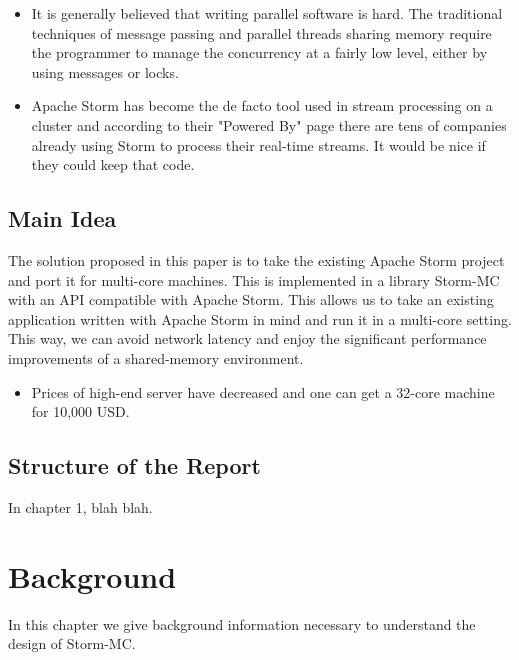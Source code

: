 \documentclass[bsc,frontabs,twoside,singlespacing,normalheadings,parskip,logo]{infthesis}     %
\begin{document}
\begin{itemize}

\item It is generally believed that writing parallel software is hard. The traditional techniques of message passing and parallel threads sharing memory require the programmer to manage the concurrency at a fairly low level, either by using messages or locks.

\item Apache Storm has become the de facto tool used in stream processing on a cluster and according to their "Powered By" page \cite{Anonymous:eikzOt4-} there are tens of companies already using Storm to process their real-time streams. It would be nice if they could keep that code.

\end{itemize}

\section{Main Idea}

The solution proposed in this paper is to take the existing Apache Storm project and port it for multi-core machines. This is implemented in a library Storm-MC with an API compatible with Apache Storm. This allows us to take an existing application written with Apache Storm in mind and run it in a multi-core setting. This way, we can avoid network latency and enjoy the significant performance improvements of a shared-memory environment.

\begin{itemize}

	\item Prices of high-end server have decreased and one can get a 32-core machine for 10,000 USD.

\end{itemize}

\section{Structure of the Report}

In chapter 1, blah blah.

\chapter{Background}

In this chapter we give background information necessary to understand the design of Storm-MC.
\end{document}
